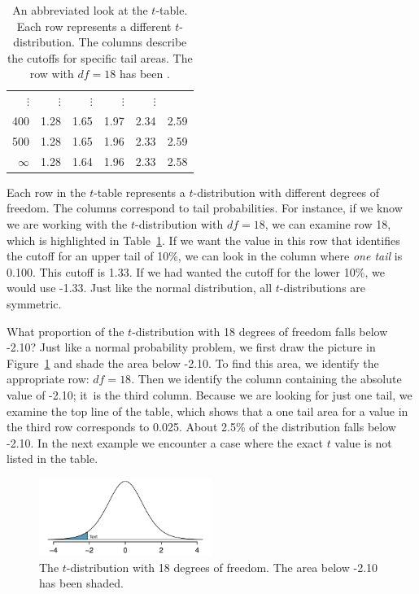 \begin{table}[hht]
\begin{tabular}{r | rrr rr}
$\vdots$ & $\vdots$ &$\vdots$ &$\vdots$ &$\vdots$ & \\
400  &  {\normalsize  1.28} & {\normalsize  1.65} & {\normalsize  1.97} & {\normalsize  2.34} & {\normalsize  2.59}  \\ 
500  &  {\normalsize  1.28} & {\normalsize  1.65} & {\normalsize  1.96} & {\normalsize  2.33} & {\normalsize  2.59}  \\ 
$\infty$  &  {\normalsize  1.28} & {\normalsize  1.64} & {\normalsize  1.96} & {\normalsize  2.33} & {\normalsize  2.58}  \\ 
\end{tabular}
\caption{An abbreviated look at the $t$-table. Each row represents a different $t$-distribution. The columns describe the cutoffs for specific tail areas. The row with $df=18$ has been .}
\label{tTableSample}
\end{table}

Each row in the $t$-table represents a $t$-distribution with different degrees of freedom. The columns correspond to tail probabilities. For instance, if we know we are working with the $t$-distribution with $df=18$, we can examine row 18, which is highlighted in Table~\ref{tTableSample}. If we want the value in this row that identifies the cutoff for an upper tail of 10\%, we can look in the column where \emph{one tail} is 0.100. This cutoff is 1.33. If we had wanted the cutoff for the lower 10\%, we would use -1.33. Just like the normal distribution, all $t$-distributions are symmetric.

\begin{example}{What proportion of the $t$-distribution with 18 degrees of freedom falls below -2.10?}
Just like a normal probability problem, we first draw the picture in Figure~\ref{tDistDF18LeftTail2Point10} and shade the area below -2.10. To find this area, we identify the appropriate row: \mbox{$df=18$}. Then we identify the column containing the absolute value of -2.10; it~is the third column. Because we are looking for just one tail, we examine the top line of the table, which shows that a one tail area for a value in the third row corresponds to 0.025. About 2.5\% of the distribution falls below -2.10. In the next example we encounter a case where the exact $t$ value is not listed in the table.
\end{example}

\begin{figure}
\centering
\includegraphics[width=0.5\textwidth]{ch_inference_for_means/figures/tDistDF18LeftTail2Point10/tDistDF18LeftTail2Point10}
\caption{The $t$-distribution with 18 degrees of freedom. The area below -2.10 has been shaded.}
\label{tDistDF18LeftTail2Point10}
\end{figure}

